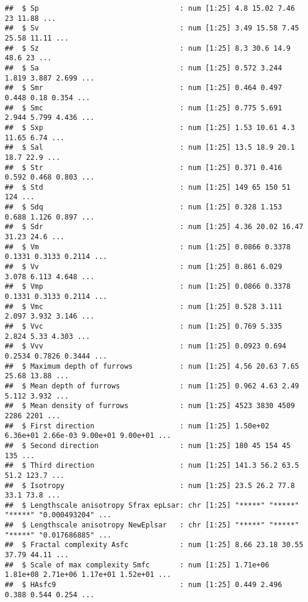 \documentclass[
]{article}
\begin{document}
\begin{verbatim}
##  $ Sp                                 : num [1:25] 4.8 15.02 7.46 23 11.88 ...
##  $ Sv                                 : num [1:25] 3.49 15.58 7.45 25.58 11.11 ...
##  $ Sz                                 : num [1:25] 8.3 30.6 14.9 48.6 23 ...
##  $ Sa                                 : num [1:25] 0.572 3.244 1.819 3.887 2.699 ...
##  $ Smr                                : num [1:25] 0.464 0.497 0.448 0.18 0.354 ...
##  $ Smc                                : num [1:25] 0.775 5.691 2.944 5.799 4.436 ...
##  $ Sxp                                : num [1:25] 1.53 10.61 4.3 11.65 6.74 ...
##  $ Sal                                : num [1:25] 13.5 18.9 20.1 18.7 22.9 ...
##  $ Str                                : num [1:25] 0.371 0.416 0.592 0.468 0.803 ...
##  $ Std                                : num [1:25] 149 65 150 51 124 ...
##  $ Sdq                                : num [1:25] 0.328 1.153 0.688 1.126 0.897 ...
##  $ Sdr                                : num [1:25] 4.36 20.02 16.47 31.23 24.6 ...
##  $ Vm                                 : num [1:25] 0.0866 0.3378 0.1331 0.3133 0.2114 ...
##  $ Vv                                 : num [1:25] 0.861 6.029 3.078 6.113 4.648 ...
##  $ Vmp                                : num [1:25] 0.0866 0.3378 0.1331 0.3133 0.2114 ...
##  $ Vmc                                : num [1:25] 0.528 3.111 2.097 3.932 3.146 ...
##  $ Vvc                                : num [1:25] 0.769 5.335 2.824 5.33 4.303 ...
##  $ Vvv                                : num [1:25] 0.0923 0.694 0.2534 0.7826 0.3444 ...
##  $ Maximum depth of furrows           : num [1:25] 4.56 20.63 7.65 25.68 13.88 ...
##  $ Mean depth of furrows              : num [1:25] 0.962 4.63 2.49 5.112 3.932 ...
##  $ Mean density of furrows            : num [1:25] 4523 3830 4509 2286 2201 ...
##  $ First direction                    : num [1:25] 1.50e+02 6.36e+01 2.66e-03 9.00e+01 9.00e+01 ...
##  $ Second direction                   : num [1:25] 180 45 154 45 135 ...
##  $ Third direction                    : num [1:25] 141.3 56.2 63.5 51.2 123.7 ...
##  $ Isotropy                           : num [1:25] 23.5 26.2 77.8 33.1 73.8 ...
##  $ Lengthscale anisotropy Sfrax epLsar: chr [1:25] "*****" "*****" "*****" "0.000493204" ...
##  $ Lengthscale anisotropy NewEplsar   : chr [1:25] "*****" "*****" "*****" "0.017686885" ...
##  $ Fractal complexity Asfc            : num [1:25] 8.66 23.18 30.55 37.79 44.11 ...
##  $ Scale of max complexity Smfc       : num [1:25] 1.71e+06 1.81e+08 2.71e+06 1.17e+01 1.52e+01 ...
##  $ HAsfc9                             : num [1:25] 0.449 2.496 0.388 0.544 0.254 ...

\end{verbatim}
\end{document}

